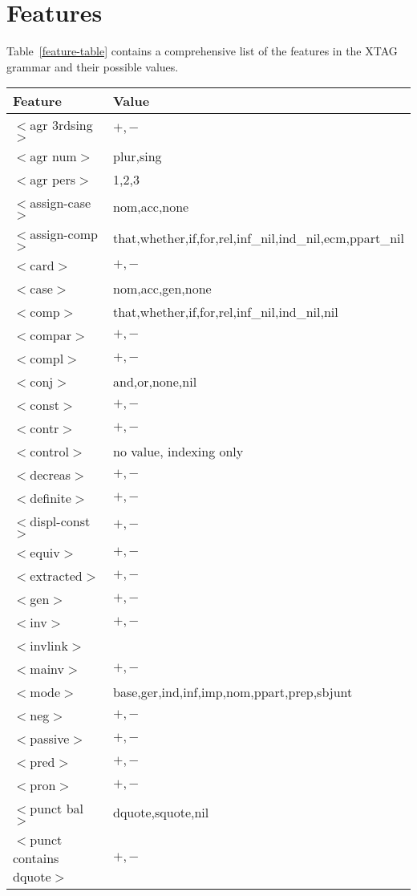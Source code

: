 \chapter{Features}
\label{features}

Table~\ref{feature-table} contains a comprehensive list of the features in the
XTAG grammar and their possible values.

\footnotesize
\begin{table}[hbt]
\centering
\begin{tabular}{|l|l|}
\hline
Feature&Value\\
\hline
\hline
$<$agr 3rdsing$>$&$+,-$\\
$<$agr num$>$&plur,sing\\
$<$agr pers$>$&1,2,3\\
$<$assign-case$>$&nom,acc,none\\
$<$assign-comp$>$&that,whether,if,for,rel,inf\_nil,ind\_nil,ecm,ppart\_nil\\
$<$card$>$&$+,-$\\
$<$case$>$&nom,acc,gen,none\\
$<$comp$>$&that,whether,if,for,rel,inf\_nil,ind\_nil,nil\\
$<$compar$>$&$+,-$\\
$<$compl$>$&$+,-$\\
$<$conj$>$&and,or,none,nil\\
$<$const$>$&$+,-$\\
$<$contr$>$&$+,-$\\
$<$control$>$&no value, indexing only\\
$<$decreas$>$&$+,-$\\
$<$definite$>$&$+,-$\\
$<$displ-const$>$&$+,-$\\
$<$equiv$>$&$+,-$\\
$<$extracted$>$&$+,-$\\
$<$gen$>$&$+,-$\\
$<$inv$>$&$+,-$\\
$<$invlink$>$&\\
$<$mainv$>$&$+,-$\\
$<$mode$>$&base,ger,ind,inf,imp,nom,ppart,prep,sbjunt\\
$<$neg$>$&$+,-$\\
$<$passive$>$&$+,-$\\
$<$pred$>$&$+,-$\\
$<$pron$>$&$+,-$\\
$<$punct bal$>$&dquote,squote,nil\\
$<$punct contains dquote$>$&$+,-$\\

\end{tabular}
\end{table}
